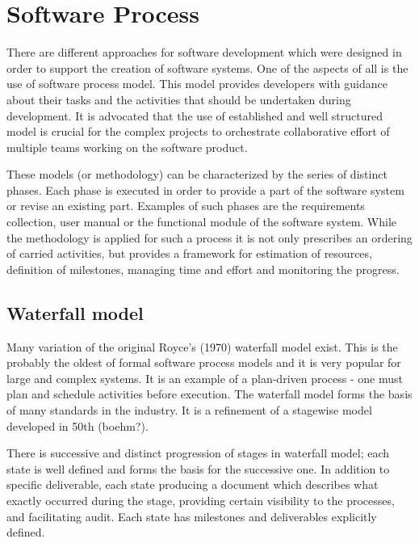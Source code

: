 \chapter{Software Process}
There are different approaches for software development which were designed in order to 
support the creation of software systems. One of the aspects of all is the use of 
software process model. This model provides developers with guidance about their tasks 
and the activities that should be undertaken during development. It is advocated that the 
use of established and well structured model is crucial for the complex projects to 
orchestrate collaborative effort of multiple teams working on the software product. 

These models (or methodology) can be characterized by the series of distinct phases. 
Each phase is executed in order to provide a part of the software system or revise 
an existing part. Examples of such phases are the requirements collection, user manual 
or the functional module of the software system. While the methodology is applied for 
such a process it is not only prescribes an ordering of carried activities, but 
provides a framework for estimation of resources, definition of milestones, managing 
time and effort and monitoring the progress. 

\section{Waterfall model}
Many variation of the original Royce's (1970) waterfall model 
\cite{citeulike:9982731}  exist.
This is the probably the oldest of formal software process models and it is very popular 
for large and complex systems. It is an example of a plan-driven process - one must 
plan and schedule activities before execution. The waterfall 
model forms the basis of many standards in the industry. It is a refinement of a 
stagewise model developed in 50th (boehm?).

There is successive and distinct progression of stages in waterfall model; each state 
is well defined and forms the basis for the successive one. In addition to specific 
deliverable, each state producing a document which describes what exactly occurred 
during the stage, providing certain visibility to the processes, and facilitating 
audit. Each state has milestones and deliverables explicitly defined.

